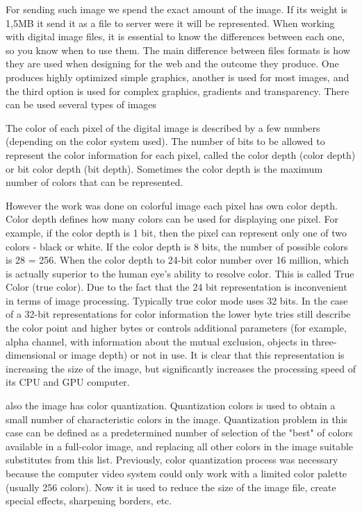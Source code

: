For sending such image we spend the exact amount of the image. If its weight is 1,5MB it send it as a file to server were it will be represented. When working with digital image files, it is essential to know the differences between each one, so you know when to use them. The main difference between files formats is how they are used when designing for the web and the outcome they produce. One produces highly optimized simple graphics, another is used for most images, and the third option is used for complex graphics, gradients and transparency. There can be used several types of images

The color of each pixel of the digital image is described by a few numbers (depending on the color system used). The number of bits to be allowed to represent the color information for each pixel, called the color depth (color depth) or bit color depth (bit depth). Sometimes the color depth is the maximum number of colors that can be represented.

However the work was done on colorful image each pixel has own color depth. Color depth defines how many colors can be used for displaying one pixel. For example, if the color depth is 1 bit, then the pixel can represent only one of two colors - black or white. If the color depth is 8 bits, the number of possible colors is 28 = 256. When the color depth to 24-bit color number over 16 million, which is actually superior to the human eye's ability to resolve color. This is called True Color (true color). Due to the fact that the 24 bit representation is inconvenient in terms of image processing. Typically true color mode uses 32 bits. In the case of a 32-bit representations for color information the lower byte tries still describe the color point and higher bytes or controls additional parameters (for example, alpha channel, with information about the mutual exclusion, objects in three-dimensional or image depth) or not in use. It is clear that this representation is increasing the size of the image, but significantly increases the processing speed of its CPU and GPU computer.

also the image has color quantization. Quantization colors is used to obtain a small number of characteristic colors in the image. Quantization problem in this case can be defined as a predetermined number of selection of the "best" of colors available in a full-color image, and replacing all other colors in the image suitable substitutes from this list. Previously, color quantization process was necessary because the computer video system could only work with a limited color palette (usually 256 colors). Now it is used to reduce the size of the image file, create special effects, sharpening borders, etc.

